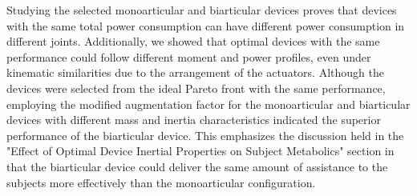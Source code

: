 \documentclass[10pt,letterpaper]{article}
\begin{document}
Studying the selected monoarticular and biarticular devices proves that devices with the same total power consumption can have different power consumption in different joints. Additionally, we showed that optimal devices with the same performance could follow different moment and power profiles, even under kinematic similarities due to the arrangement of the actuators. Although the devices were selected from the ideal Pareto front with the same performance, employing the modified augmentation factor for the monoarticular and biarticular devices with different mass and inertia characteristics indicated the superior performance of the biarticular device. This emphasizes the discussion held in the "Effect of Optimal Device Inertial Properties on Subject Metabolics" section in that the biarticular device could deliver the same amount of assistance to the subjects more effectively than the monoarticular configuration.\\
\end{document}
